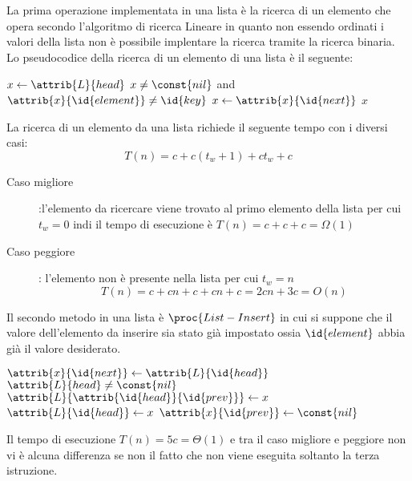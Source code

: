 La prima operazione implementata in una lista è la ricerca di un elemento che opera secondo l'algoritmo di ricerca Lineare in quanto non essendo ordinati i valori della lista
non è possibile implentare la ricerca tramite la ricerca binaria.\newline
Lo pseudocodice della ricerca di un elemento di una lista è il seguente:
\begin{codebox}
\li $x\gets \attrib{L}{head}$
\li \While $x \neq \const{nil}$ and $\attrib{x}{\id{element}} \neq \id{key}$
    \Do
\li                      $x \gets \attrib{x}{\id{next}}$
    \End
\li \Return $x$
\end{codebox}
La ricerca di un elemento da una lista richiede il seguente tempo con i diversi casi:
\begin{equation*}
  T(n) = c + c(t_w + 1) + ct_w + c
\end{equation*}
\begin{description}
  \item[Caso migliore]:l'elemento da ricercare viene trovato al primo elemento della lista
        per cui $t_w = 0$ indi il tempo di esecuzione è $T(n) = c + c + c = \Omega(1)$
  \item[Caso peggiore]: l'elemento non è presente nella lista per cui $t_w = n$
        \begin{equation*}
          T(n) = c + cn + c + cn + c = 2cn + 3c = O(n)
        \end{equation*}
\end{description}

Il secondo metodo in una lista è $\proc{List-Insert}$ in cui si suppone che il valore
dell'elemento da inserire sia stato già impostato ossia $\id{element}$ abbia già il valore desiderato.
\begin{codebox}
\li $\attrib{x}{\id{next}} \gets \attrib{L}{\id{head}}$
\li \If $\attrib{L}{head} \neq \const{nil}$
    \Then
\li                       $\attrib{L}{\attrib{\id{head}}{\id{prev}}} \gets x$
    \End
\li $\attrib{L}{\id{head}} \gets x$
\li $\attrib{x}{\id{prev}} \gets \const{nil}$
\end{codebox}
Il tempo di esecuzione $T(n) = 5c = \Theta(1)$ e tra il caso migliore e peggiore non
vi è alcuna differenza se non il fatto che non viene eseguita soltanto la terza istruzione.

